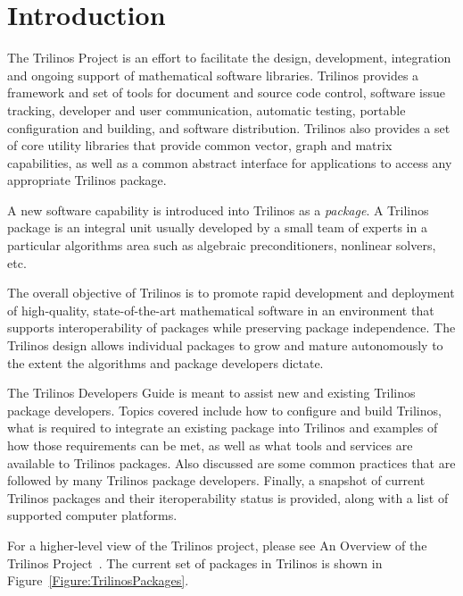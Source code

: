 \documentclass[12pt,relax]{TrilinosDevGuide}
\begin{document}
\section{Introduction}
\label{Section:Introduction}
The Trilinos Project is an effort to facilitate the design, development,
integration and ongoing support of mathematical software libraries.  Trilinos 
provides a framework and set of tools for document and source code control,
software issue tracking, developer and user communication, automatic
testing, portable configuration and building, and software
distribution.  Trilinos also provides a set of core utility libraries
that provide common vector, graph and matrix capabilities, as well as
a common abstract interface for applications to access any appropriate
Trilinos package.

A new software capability is introduced into Trilinos as a {\it
package}.  A Trilinos package is an integral unit usually developed by
a small team of experts in a particular algorithms area such as
algebraic preconditioners, nonlinear solvers, etc.

The overall objective of Trilinos is to promote rapid development and
deployment of high-quality, state-of-the-art mathematical software in
an environment that supports interoperability of packages while
preserving package independence.  The Trilinos design allows 
individual packages to grow and mature autonomously to the extent the 
algorithms and package developers dictate. 

The Trilinos Developers Guide is meant to assist new and existing
Trilinos package developers.  Topics covered include how to configure and 
build Trilinos, what is required to integrate an existing package into Trilinos
and examples of how those requirements can be met, as well as what
tools and services are 
available to Trilinos packages.  Also discussed are some common practices that 
are followed by many Trilinos package developers.  Finally, a snapshot
of current Trilinos packages and their iteroperability status
is provided, along with a list of supported computer platforms.

For a higher-level view of the Trilinos project, please see An Overview
of the Trilinos Project~\cite{Trilinos-Overview}. The current set of
packages in Trilinos is shown in Figure~\ref{Figure:TrilinosPackages}.
\end{document}
